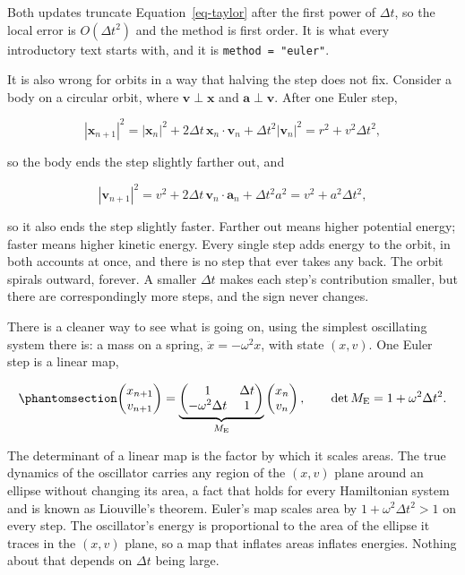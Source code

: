 \documentclass[
  10.5pt,
  letterpaper,
]{scrbook}
\theoremstyle{plain}
\theoremstyle{remark}
\begin{document}
Both updates truncate Equation~\ref{eq-taylor} after the first power of
\(\Delta t\), so the local error is \(O(\Delta t^2)\) and the method is
first order. It is what every introductory text starts with, and it is
\texttt{method\ =\ "euler"}.

It is also wrong for orbits in a way that halving the step does not fix.
Consider a body on a circular orbit, where
\(\mathbf{v} \perp \mathbf{x}\) and \(\mathbf{a} \perp \mathbf{v}\).
After one Euler step,

\[
|\mathbf{x}_{n+1}|^2 = |\mathbf{x}_n|^2 + 2\Delta t\,\mathbf{x}_n\cdot\mathbf{v}_n + \Delta t^2 |\mathbf{v}_n|^2 = r^2 + v^2\Delta t^2,
\]

so the body ends the step slightly farther out, and

\[
|\mathbf{v}_{n+1}|^2 = v^2 + 2\Delta t\,\mathbf{v}_n\cdot\mathbf{a}_n + \Delta t^2 a^2 = v^2 + a^2\Delta t^2,
\]

so it also ends the step slightly faster. Farther out means higher
potential energy; faster means higher kinetic energy. Every single step
adds energy to the orbit, in both accounts at once, and there is no step
that ever takes any back. The orbit spirals outward, forever. A smaller
\(\Delta t\) makes each step's contribution smaller, but there are
correspondingly more steps, and the sign never changes.

There is a cleaner way to see what is going on, using the simplest
oscillating system there is: a mass on a spring,
\(\ddot{x} = -\omega^2 x\), with state \((x, v)\). One Euler step is a
linear map,

\begin{equation}\protect\phantomsection\label{eq-euler-matrix}{
\begin{pmatrix} x_{n+1} \\ v_{n+1} \end{pmatrix}
= \underbrace{\begin{pmatrix} 1 & \Delta t \\ -\omega^2\Delta t & 1 \end{pmatrix}}_{M_{\mathrm{E}}}
\begin{pmatrix} x_n \\ v_n \end{pmatrix},
\qquad \det M_{\mathrm{E}} = 1 + \omega^2\Delta t^2.
}\end{equation}

The determinant of a linear map is the factor by which it scales areas.
The true dynamics of the oscillator carries any region of the \((x, v)\)
plane around an ellipse without changing its area, a fact that holds for
every Hamiltonian system and is known as Liouville's theorem. Euler's
map scales area by \(1 + \omega^2\Delta t^2 > 1\) on every step. The
oscillator's energy is proportional to the area of the ellipse it traces
in the \((x, v)\) plane, so a map that inflates areas inflates energies.
Nothing about that depends on \(\Delta t\) being large.
\end{document}
